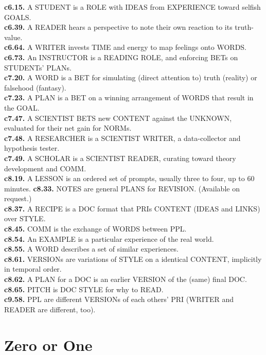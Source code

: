\documentclass[
]{book}
\begin{document}
\textbf{c6.15.} A STUDENT is a ROLE with IDEAS from EXPERIENCE toward selfish GOALS.\\
\textbf{c6.39.} A READER hears a perspective to note their own reaction to its truth-value.\\
\textbf{c6.64.} A WRITER invests TIME and energy to map feelings onto WORDS.\\
\textbf{c6.73.} An INSTRUCTOR is a READING ROLE, and enforcing BETs on STUDENTs' PLANs.\\
\textbf{c7.20.} A WORD is a BET for simulating (direct attention to) truth (reality) or falsehood (fantasy).\\
\textbf{c7.23.} A PLAN is a BET on a winning arrangement of WORDS that result in the GOAL.\\
\textbf{c7.47.} A SCIENTIST BETS new CONTENT against the UNKNOWN, evaluated for their net gain for NORMs.\\
\textbf{c7.48.} A RESEARCHER is a SCIENTIST WRITER, a data-collector and hypothesis tester.\\
\textbf{c7.49.} A SCHOLAR is a SCIENTIST READER, curating toward theory development and COMM.\\
\textbf{c8.19.} A LESSON is an ordered set of prompts, usually three to four, up to 60 minutes.
\textbf{c8.33.} NOTES are general PLANS for REVISION. (Available on request.)\\
\textbf{c8.37.} A RECIPE is a DOC format that PRIs CONTENT (IDEAS and LINKS) over STYLE.\\
\textbf{c8.45.} COMM is the exchange of WORDS between PPL.\\
\textbf{c8.54.} An EXAMPLE is a particular experience of the real world.\\
\textbf{c8.55.} A WORD describes a set of similar experiences.\\
\textbf{c8.61.} VERSIONs are variations of STYLE on a identical CONTENT, implicitly in temporal order.\\
\textbf{c8.62.} A PLAN for a DOC is an earlier VERSION of the (same) final DOC.\\
\textbf{c8.65.} PITCH is DOC STYLE for why to READ.\\
\textbf{c9.58.} PPL are different VERSIONs of each others' PRI (WRITER and READER are different, too).

\hypertarget{appendix-lessons}{%
\appendix}


\hypertarget{zero-or-one}{%
\chapter{Zero or One}\label{zero-or-one}}
\end{document}

